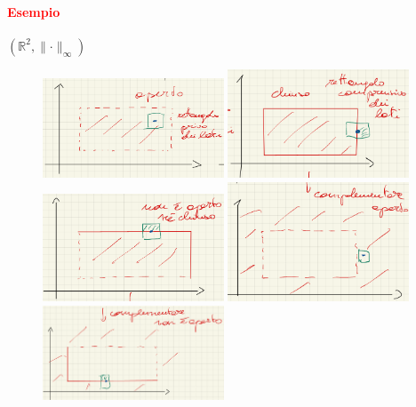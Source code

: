 \documentclass{article}
\newcommand{\R}{\mathbb{R}}
\begin{document}
\paragraph{\textcolor{red}{Esempio}}
$(\R^2,\parallel\cdot\parallel_\infty)$
\begin{figure}[h!]
    \centering
    \includegraphics[width=0.48\textwidth]{quad1.png} \includegraphics[width=0.48\textwidth]{quad2.png} \\[\smallskipamount]
    \includegraphics[width=0.48\textwidth]{quad3.png} \includegraphics[width=0.48\textwidth]{quad4.png} \\[\smallskipamount]
    \includegraphics[width=0.48\textwidth]{quad5.png}
\end{figure}
\end{document}
